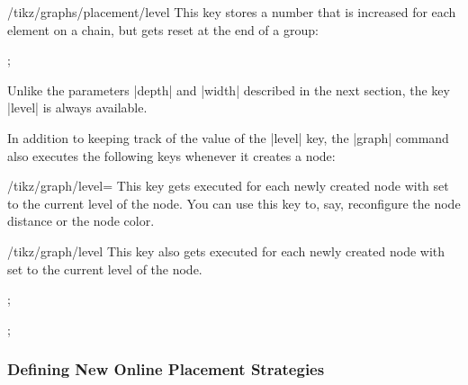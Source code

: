 \begin{key}{/tikz/graphs/placement/level}
  This key stores a number that is increased for each element on a
  chain, but gets reset at the end of a group:
\begin{codeexample}[]
\tikz {};
\end{codeexample}
  Unlike the parameters |depth| and |width| described in the next
  section, the key |level| is always available.
\end{key}

In addition to keeping track of the value of the |level| key, the
|graph| command also executes the following keys whenever it creates a
node:

\begin{stylekey}{/tikz/graph/level=}
  This key gets executed for each newly created node with 
  set to the current level of the node. You can use this key to, say,
  reconfigure the node distance or the node color.
\end{stylekey}

\begin{stylekey}{/tikz/graph/level }
  This key also gets executed for each newly created node with
   set to the current level of the node.
\begin{codeexample}[]
\tikz {};
\end{codeexample}
\begin{codeexample}[]
\tikz {};
\end{codeexample}
\end{stylekey}



\subsubsection{Defining New Online Placement Strategies}

\label{section-library-graphs-new-online}

